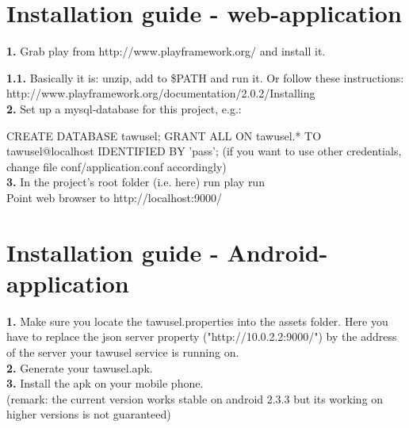 \section{Installation guide - web-application}\label{wo6_3}

\textbf{1.} Grab play from http://www.playframework.org/ and install it.

\textbf{1.1.} Basically it is: unzip, add to \$PATH and run it. Or follow these instructions:
http://www.playframework.org/documentation/2.0.2/Installing\\
\textbf{2.} Set up a mysql-database for this project, e.g.:

CREATE DATABASE tawusel; GRANT ALL ON tawusel.* TO tawusel@localhost IDENTIFIED BY 'pass'; (if you want to use other credentials,
change file conf/application.conf accordingly)\\
\textbf{3.} In the project's root folder (i.e. here) run play run\\

Point web browser to http://localhost:9000/

\section{Installation guide - Android-application}\label{wo6_4}

\textbf{1.} Make sure you locate the tawusel.properties into the assets folder. Here you have to replace the json server
property ("http://10.0.2.2:9000/") by the address of the server your tawusel service is running on.\\
\textbf{2.} Generate your tawusel.apk.\\
\textbf{3.} Install the apk on your mobile phone.\\
(remark: the current version works stable on android 2.3.3 but its working on higher versions is not guaranteed)
